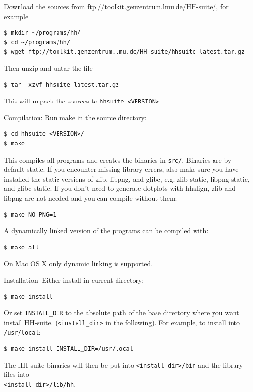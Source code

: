 \documentclass[11pt,a4paper]{article}
\begin{document}
\begin{enum}

\item Download the sources from \url{ftp://toolkit.genzentrum.lmu.de/HH-suite/}, for example
\begin{verbatim}
$ mkdir ~/programs/hh/
$ cd ~/programs/hh/
$ wget ftp://toolkit.genzentrum.lmu.de/HH-suite/hhsuite-latest.tar.gz 
\end{verbatim}
\vspace{2mm}


\item Then unzip and untar the file
\begin{verbatim}
$ tar -xzvf hhsuite-latest.tar.gz
\end{verbatim}
This will unpack the sources to \verb`hhsuite-<VERSION>`.
\vspace{2mm}


\item Compilation: Run make in the source directory:
\begin{verbatim}
$ cd hhsuite-<VERSION>/
$ make
\end{verbatim}
This compiles all programs and creates the binaries in \verb`src/`. Binaries are by default static. If you encounter
missing library errors, also make sure you have installed the static versions of zlib, libpng, and glibc, e.g. zlib-static, libpng-static, and glibc-static.
If you don't need to generate dotplots with hhalign, zlib and libpng are not
needed and you can compile without them:
\begin{verbatim}
$ make NO_PNG=1
\end{verbatim}


A dynamically linked version of the programs can be compiled with:
\begin{verbatim}
$ make all
\end{verbatim}
On Mac OS X only dynamic linking is supported.
\vspace{2mm}


\item Installation: Either install in current directory:
\begin{verbatim}
$ make install
\end{verbatim}
Or set \verb`INSTALL_DIR` to the absolute path of the base directory where you want install HH-suite.
(\verb`<install_dir>` in the following). For example, to install into \verb`/usr/local`:
\begin{verbatim}
$ make install INSTALL_DIR=/usr/local
\end{verbatim}
The HH-suite binaries will then be put into \verb`<install_dir>/bin` and the library files into\\
\verb`<install_dir>/lib/hh`.
\vspace{2mm}



\end{enum}
\end{document}
